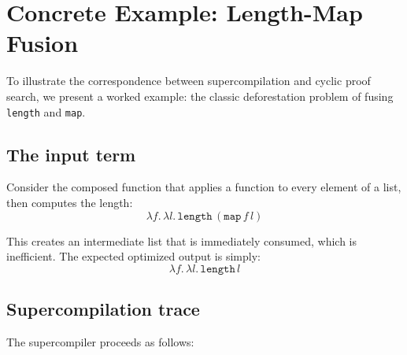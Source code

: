 \section{Concrete Example: Length-Map Fusion}
\label{sec:example}

To illustrate the correspondence between supercompilation and cyclic proof search, we present a worked example: the classic deforestation problem of fusing \texttt{length} and \texttt{map}.

\subsection{The input term}

Consider the composed function that applies a function to every element of a list, then computes the length:
\[
\lambda f.\, \lambda l.\, \mathtt{length}\,(\mathtt{map}\,f\,l)
\]

This creates an intermediate list that is immediately consumed, which is inefficient. The expected optimized output is simply:
\[
\lambda f.\, \lambda l.\, \mathtt{length}\,l
\]

\subsection{Supercompilation trace}

The supercompiler proceeds as follows:

